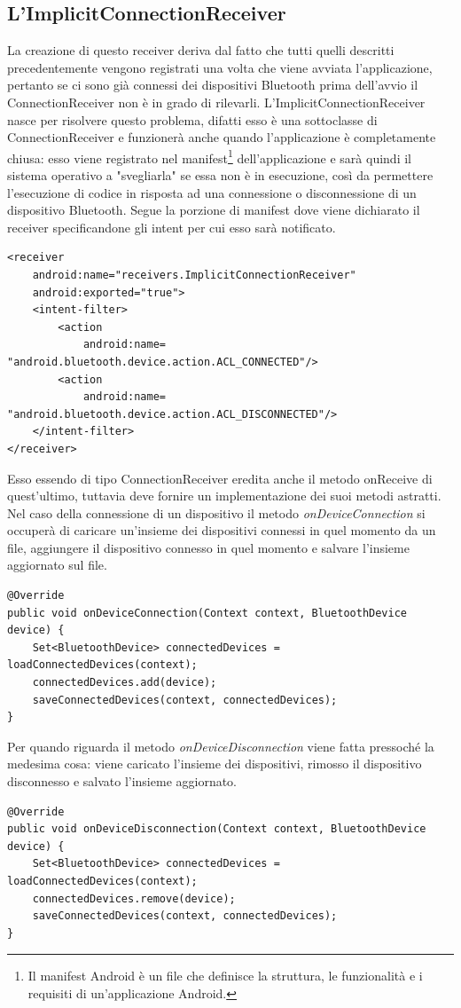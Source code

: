 \subsection{L'ImplicitConnectionReceiver}
La creazione di questo receiver deriva dal fatto che tutti quelli descritti precedentemente vengono registrati una volta che viene avviata l'applicazione, pertanto se ci sono già connessi dei dispositivi Bluetooth prima dell'avvio il ConnectionReceiver non è in grado di rilevarli. L'ImplicitConnectionReceiver nasce per risolvere questo problema, difatti esso è una sottoclasse di ConnectionReceiver e funzionerà anche quando l'applicazione è completamente chiusa: esso viene registrato nel manifest\footnote{Il manifest Android è un file che definisce la struttura, le funzionalità e i requisiti di un'applicazione Android.} dell'applicazione e sarà quindi il sistema operativo a "svegliarla" se essa non è in esecuzione, così da permettere l'esecuzione di codice in risposta ad una connessione o disconnessione di un dispositivo Bluetooth. Segue la porzione di manifest dove viene dichiarato il receiver specificandone gli intent per cui esso sarà notificato.
\begin{verbatim}
<receiver 
    android:name="receivers.ImplicitConnectionReceiver"
    android:exported="true">
    <intent-filter>
        <action 
            android:name= "android.bluetooth.device.action.ACL_CONNECTED"/>
        <action
            android:name= "android.bluetooth.device.action.ACL_DISCONNECTED"/>
    </intent-filter>
</receiver>
\end{verbatim}

Esso essendo di tipo ConnectionReceiver eredita anche il metodo onReceive di quest'ultimo, tuttavia deve fornire un implementazione dei suoi metodi astratti. Nel caso della connessione di un dispositivo il metodo \textit{onDeviceConnection} si occuperà di caricare un'insieme dei dispositivi connessi in quel momento da un file, aggiungere il dispositivo connesso in quel momento e salvare l'insieme aggiornato sul file.
\begin{verbatim}
@Override
public void onDeviceConnection(Context context, BluetoothDevice device) {
    Set<BluetoothDevice> connectedDevices = loadConnectedDevices(context);
    connectedDevices.add(device);
    saveConnectedDevices(context, connectedDevices);
}
\end{verbatim}

Per quando riguarda il metodo \textit{onDeviceDisconnection} viene fatta pressoché la medesima cosa: viene caricato l'insieme dei dispositivi, rimosso il dispositivo disconnesso e salvato l'insieme aggiornato.
\begin{verbatim}
@Override
public void onDeviceDisconnection(Context context, BluetoothDevice device) {
    Set<BluetoothDevice> connectedDevices = loadConnectedDevices(context);
    connectedDevices.remove(device);
    saveConnectedDevices(context, connectedDevices);
}
\end{verbatim}

